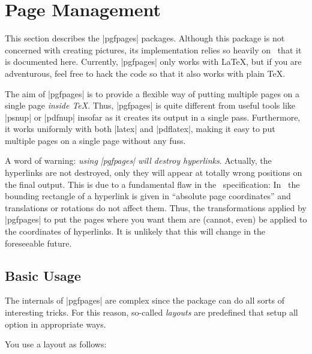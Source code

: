 %
%
%


\section{Page Management}

This section describes the |pgfpages| packages. Although this package
is not concerned with creating pictures, its implementation relies so
heavily on \pgfname\ that it is documented here. Currently, |pgfpages|
only works with \LaTeX, but if you are adventurous, feel free to hack
the code so that it also works with plain \TeX.

The aim of |pgfpages| is to provide a flexible way of putting multiple
pages on a single page \emph{inside \TeX}. Thus, |pgfpages| is quite
different from useful tools like |psnup| or |pdfnup| insofar as it
creates its output in a single pass. Furthermore, it works uniformly
with both |latex| and |pdflatex|, making it easy to put multiple pages
on a single page without any fuss.

A word of warning: \emph{using |pgfpages| will destroy
  hyperlinks}. Actually, the hyperlinks are not destroyed, only they
will appear at totally wrong positions on the final output. This is
due to a fundamental flaw in the \pdf\ specification: In \pdf\ the
bounding rectangle of a hyperlink is given in ``absolute
page coordinates'' and translations or rotations do not affect
them. Thus, the transformations applied by |pgfpages| to put the pages
where you want them are (cannot, even) be applied to the coordinates
of hyperlinks. It is unlikely that this will change in the foreseeable
future.


\subsection{Basic Usage}

The internals of |pgfpages| are complex since the package can do all
sorts of interesting tricks. For this reason, so-called \emph{layouts}
are predefined that setup all option in appropriate ways.

You use a layout as follows:

